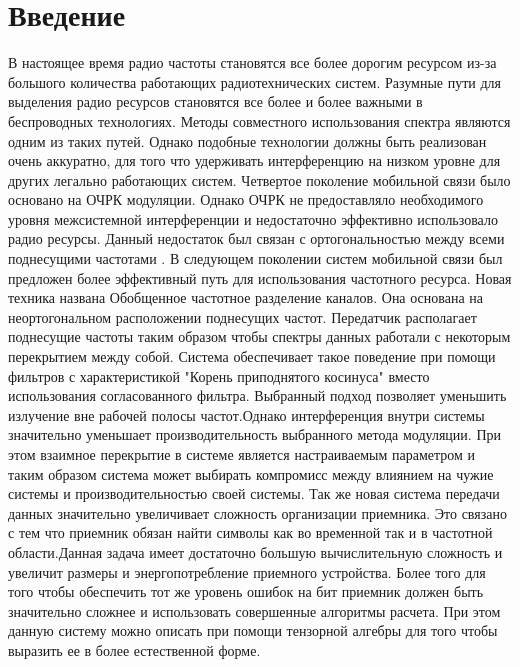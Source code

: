 \chapter{Введение}
В настоящее время радио частоты становятся все более дорогим ресурсом из-за большого количества работающих радиотехнических систем. Разумные пути для выделения радио ресурсов становятся все более и более важными в беспроводных технологиях. Методы совместного использования спектра являются одним из таких путей\cite{Book32}. Однако подобные технологии должны быть реализован очень аккуратно, для того что удерживать интерференцию на низком уровне для других легально работающих систем\cite{Book34}\cite{Book35}.  Четвертое поколение мобильной связи было основано на ОЧРК модуляции. Однако ОЧРК не предоставляло необходимого уровня межсистемной интерференции и недостаточно эффективно использовало радио ресурсы. Данный недостаток был связан с ортогональностью между всеми поднесущими частотами \cite{Book34} \cite{Book33}. В следующем поколении систем мобильной связи был предложен более эффективный путь для использования частотного ресурса. Новая техника названа Обобщенное частотное разделение каналов. Она основана на неортогональном расположении поднесущих частот. Передатчик располагает поднесущие частоты таким образом чтобы спектры данных работали с некоторым перекрытием между собой. Система обеспечивает такое поведение при помощи фильтров с характеристикой "Корень приподнятого косинуса" вместо использования согласованного фильтра. Выбранный подход позволяет уменьшить излучение вне рабочей полосы частот.Однако интерференция внутри системы значительно уменьшает производительность выбранного метода модуляции. При этом взаимное перекрытие в системе является настраиваемым параметром и таким образом система может выбирать компромисс между влиянием на чужие системы и производительностью своей системы. Так же новая система передачи данных значительно увеличивает сложность организации приемника. Это связано с тем что приемник обязан найти символы как во временной так и в частотной области.Данная задача имеет достаточно большую вычислительную сложность и увеличит размеры и энергопотребление приемного устройства. Более того для того чтобы обеспечить тот же уровень ошибок на бит приемник должен быть значительно сложнее и использовать совершенные алгоритмы расчета. При этом данную систему можно описать при помощи тензорной алгебры для того чтобы выразить ее в более естественной форме.
